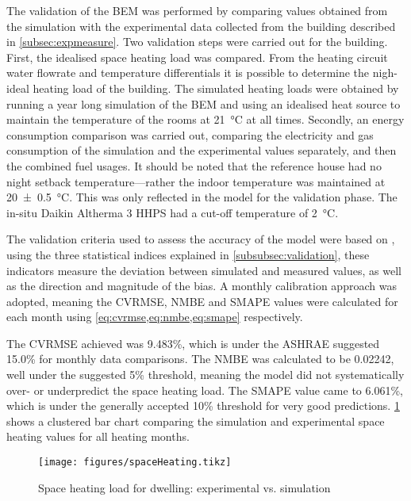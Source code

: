 The validation of the \ac{BEM} was performed by comparing values obtained from the simulation with the experimental data collected from the building described in \cref{subsec:expmeasure}. Two validation steps were carried out for the building. First, the idealised space heating load was compared. From the heating circuit water flowrate and temperature differentials it is possible to determine the nigh-ideal heating load of the building. The simulated heating loads were obtained by running a year long simulation of the \ac{BEM} and using an idealised heat source to maintain the temperature of the rooms at \qty{21}{\celsius} at all times. Secondly, an energy consumption comparison was carried out, comparing the electricity and gas consumption of the simulation and the experimental values separately, and then the combined fuel usages. It should be noted that the reference house had no night setback temperature---rather the indoor temperature was maintained at \SI[separate-uncertainty = true]{20(0.5)}{\celsius}. This was only reflected in the \modelica model for the validation phase. The in-situ Daikin Altherma 3 \ac{HHPS} had a cut-off temperature of \qty{2}{\celsius}.

The validation criteria used to assess the accuracy of the model were based on   \cite{ashrae_guideline_project_committee_14_ashrae_2014}, using the three statistical indices explained in \cref{subsubsec:validation}, these indicators measure the deviation between simulated and measured values, as well as the direction and magnitude of the bias. A monthly calibration approach was adopted, meaning the \ac{CVRMSE}, \ac{NMBE} and \ac{SMAPE} values were calculated for each month using \cref{eq:cvrmse,eq:nmbe,eq:smape} respectively. 

The \ac{CVRMSE} achieved was 9.483\%, which is under the ASHRAE suggested 15.0\% for monthly data comparisons. The \ac{NMBE} was calculated to be 0.02242, well under the suggested 5\%  threshold, meaning the model did not systematically over- or underpredict the space heating load. The \ac{SMAPE} value came to 6.061\%, which is under the generally accepted 10\% threshold for very good predictions. \cref{fig:spaceheatingcalib} shows a clustered bar chart comparing the simulation and experimental space heating values for all heating months. 

\begin{figure}[htb]
    \centering
    \texttt{[image: figures/spaceHeating.tikz]}
    \caption{Space heating load for dwelling: experimental vs. simulation}
    \label{fig:spaceheatingcalib}
\end{figure}


